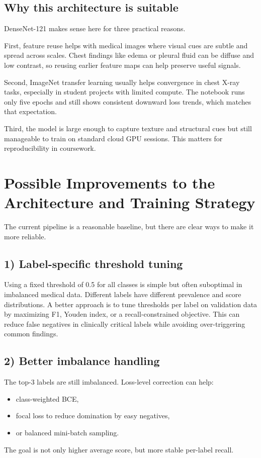 \documentclass[12pt]{article}
\begin{document}
\subsection{Why this architecture is suitable}
DenseNet-121 makes sense here for three practical reasons.

First, feature reuse helps with medical images where visual cues are subtle and spread across scales. Chest findings like edema or pleural fluid can be diffuse and low contrast, so reusing earlier feature maps can help preserve useful signals.

Second, ImageNet transfer learning usually helps convergence in chest X-ray tasks, especially in student projects with limited compute. The notebook runs only five epochs and still shows consistent downward loss trends, which matches that expectation.

Third, the model is large enough to capture texture and structural cues but still manageable to train on standard cloud GPU sessions. This matters for reproducibility in coursework.

\section{Possible Improvements to the Architecture and Training Strategy}
The current pipeline is a reasonable baseline, but there are clear ways to make it more reliable.

\subsection{1) Label-specific threshold tuning}
Using a fixed threshold of 0.5 for all classes is simple but often suboptimal in imbalanced medical data. Different labels have different prevalence and score distributions. A better approach is to tune thresholds per label on validation data by maximizing F1, Youden index, or a recall-constrained objective. This can reduce false negatives in clinically critical labels while avoiding over-triggering common findings.

\subsection{2) Better imbalance handling}
The top-3 labels are still imbalanced. Loss-level correction can help:
\begin{itemize}
    \item class-weighted BCE,
    \item focal loss to reduce domination by easy negatives,
    \item or balanced mini-batch sampling.
\end{itemize}
The goal is not only higher average score, but more stable per-label recall.
\end{document}
